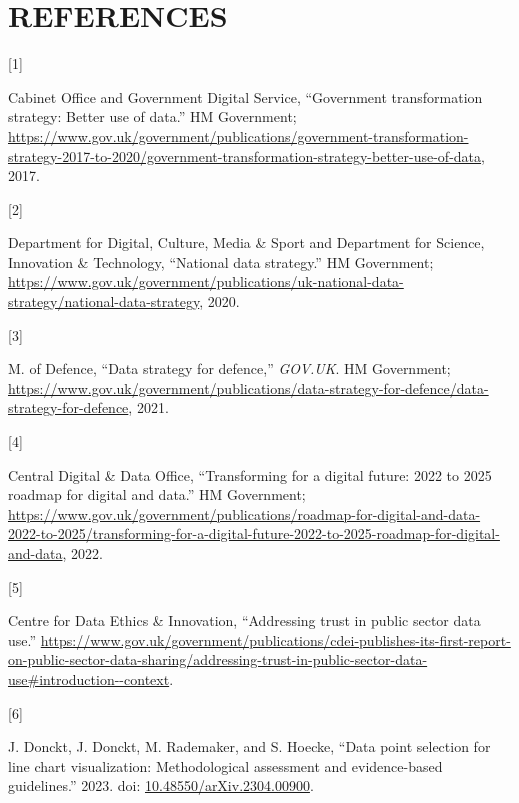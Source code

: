 \documentclass{article}
\newlength{\cslhangindent}
\newlength{\csllabelwidth}
\newlength{\cslentryspacingunit} %
\newenvironment{CSLReferences}[2] %
 {%
  \setlength{\parindent}{0pt}
  \ifodd #1
  \let\oldpar\par
  \def\par{\hangindent=\cslhangindent\oldpar}
  \fi
  \setlength{\parskip}{#2\cslentryspacingunit}
 }%
 {}
\newcommand{\CSLLeftMargin}[1]{\parbox[t]{\csllabelwidth}{#1}}
\newcommand{\CSLRightInline}[1]{\parbox[t]{\linewidth - \csllabelwidth}{#1}\break}
\begin{document}
\newpage

\hypertarget{references}{%
\section*{REFERENCES}\label{references}}

\hypertarget{refs}{}
\begin{CSLReferences}{0}{0}
\leavevmode{}%
\CSLLeftMargin{{[}1{]} }
\CSLRightInline{Cabinet Office and Government Digital Service,
{``Government transformation strategy: Better use of data.''} HM
Government;
\url{https://www.gov.uk/government/publications/government-transformation-strategy-2017-to-2020/government-transformation-strategy-better-use-of-data},
2017.}

\leavevmode{}%
\CSLLeftMargin{{[}2{]} }
\CSLRightInline{Department for Digital, Culture, Media \& Sport and
Department for Science, Innovation \& Technology, {``National data
strategy.''} HM Government;
\url{https://www.gov.uk/government/publications/uk-national-data-strategy/national-data-strategy},
2020.}

\leavevmode{}%
\CSLLeftMargin{{[}3{]} }
\CSLRightInline{M. of Defence, {``Data strategy for defence,''}
\emph{GOV.UK}. HM Government;
\url{https://www.gov.uk/government/publications/data-strategy-for-defence/data-strategy-for-defence},
2021.}

\leavevmode{}%
\CSLLeftMargin{{[}4{]} }
\CSLRightInline{Central Digital \& Data Office, {``Transforming for a
digital future: 2022 to 2025 roadmap for digital and data.''} HM
Government;
\url{https://www.gov.uk/government/publications/roadmap-for-digital-and-data-2022-to-2025/transforming-for-a-digital-future-2022-to-2025-roadmap-for-digital-and-data},
2022.}

\leavevmode{}%
\CSLLeftMargin{{[}5{]} }
\CSLRightInline{Centre for Data Ethics \& Innovation, {``Addressing
trust in public sector data use.''}
\url{https://www.gov.uk/government/publications/cdei-publishes-its-first-report-on-public-sector-data-sharing/addressing-trust-in-public-sector-data-use\#introduction--context}.}

\leavevmode{}%
\CSLLeftMargin{{[}6{]} }
\CSLRightInline{J. Donckt, J. Donckt, M. Rademaker, and S. Hoecke,
{``Data point selection for line chart visualization: Methodological
assessment and evidence-based guidelines.''} 2023. doi:
\href{https://doi.org/10.48550/arXiv.2304.00900}{10.48550/arXiv.2304.00900}.}


\end{CSLReferences}
\end{document}
